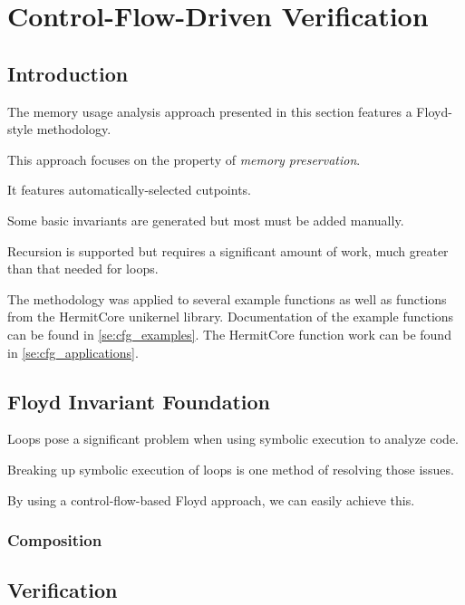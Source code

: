 \chapter{Control-Flow-Driven Verification}

\section{Introduction}\label{se:cfg_intro}
The memory usage analysis approach presented in this section features a Floyd-style methodology.

This approach focuses on the property of \emph{memory preservation}.

It features automatically-selected cutpoints.

Some basic invariants are generated but most must be added manually.

Recursion is supported but requires a significant amount of work,
much greater than that needed for loops.

The methodology was applied to several example functions
as well as functions from the HermitCore unikernel library.
Documentation of the example functions can be found in \cref{se:cfg_examples}.
The HermitCore function work can be found in \cref{se:cfg_applications}.

\section{Floyd Invariant Foundation}\label{se:cfg_invariant}

Loops pose a significant problem when using symbolic execution to analyze code.

Breaking up symbolic execution of loops is one method of resolving those issues.

By using a control-flow-based Floyd approach, we can easily achieve this.

\subsection{Composition}

\section{Verification}\label{se:cfg_verification}

